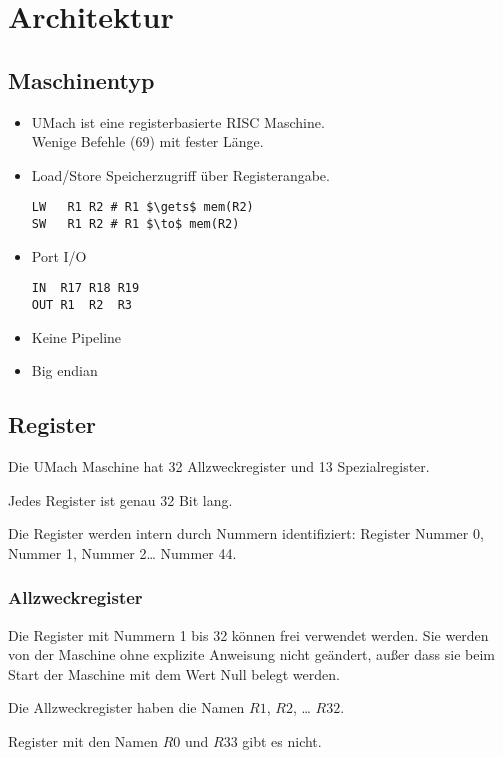 \section{Architektur}

\subsection{Maschinentyp}

\begin{frame}[fragile]{\insertsubsection}
 \begin{itemize}
  \item UMach ist eine registerbasierte RISC Maschine.\\
        
        Wenige Befehle (69) mit fester Länge.        
  \item Load/Store Speicherzugriff über Registerangabe.
\begin{lstlisting}
LW   R1 R2 # R1 $\gets$ mem(R2)
SW   R1 R2 # R1 $\to$ mem(R2)
\end{lstlisting}
  \item Port I/O
\begin{lstlisting}
IN  R17 R18 R19
OUT R1  R2  R3
\end{lstlisting}
  \item Keine Pipeline
  \item Big endian
 \end{itemize}
\end{frame}


\subsection{Register}

\begin{frame}{\insertsubsection}
 Die UMach Maschine hat 32 Allzweckregister
 und 13 Spezialregister.
 
 Jedes Register ist genau 32 Bit lang.
 
 Die Register werden intern durch Nummern identifiziert:
 Register Nummer 0, Nummer 1, Nummer 2\ldots{} Nummer 44.
\end{frame}


\subsubsection{Allzweckregister}

\begin{frame}{\insertsubsubsection}
 Die Register mit Nummern 1 bis 32 können frei verwendet werden.
 Sie werden von der Maschine ohne explizite Anweisung nicht geändert, außer
 dass sie beim Start der Maschine mit dem Wert Null belegt werden.

 Die Allzweckregister haben die Namen $R1$, $R2$, \ldots{} $R32$.
 
 Register mit den Namen $R0$ und $R33$ gibt es nicht.
\end{frame}




